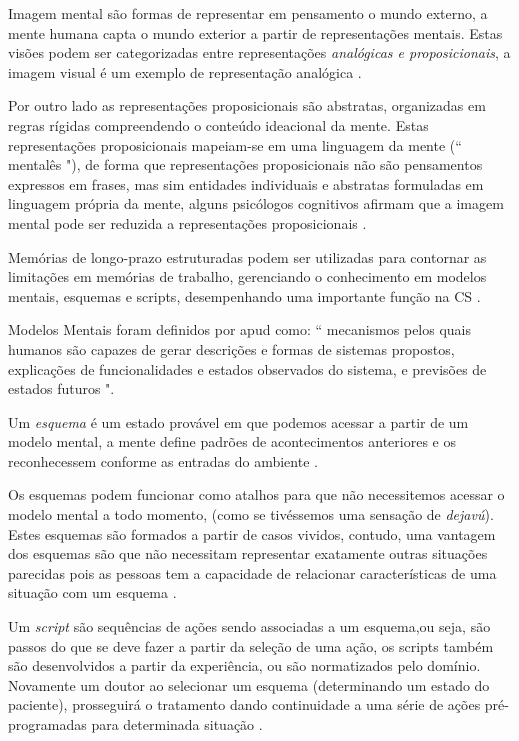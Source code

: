 \documentclass[12pt]{article}
\begin{document}
Imagem mental são formas de representar em pensamento o mundo externo, a mente humana capta o mundo exterior a partir de representações mentais. Estas visões podem ser categorizadas entre representações \textit{analógicas e proposicionais}, a imagem visual é um exemplo de representação analógica \cite{Moreira1996}. 

Por outro lado as representações proposicionais são abstratas, organizadas em regras rígidas compreendendo o conteúdo ideacional da mente. Estas representações proposicionais mapeiam-se em uma linguagem da mente (`` mentalês "), de forma que representações proposicionais não são pensamentos expressos em frases, mas sim entidades individuais e abstratas formuladas em linguagem própria da mente, alguns psicólogos cognitivos afirmam que a imagem mental pode ser reduzida a representações proposicionais  \cite{Moreira1996}.

Memórias de longo-prazo estruturadas podem ser utilizadas para contornar as limitações em memórias de trabalho, gerenciando o conhecimento em modelos mentais, esquemas e scripts, desempenhando uma importante função na CS \cite{Endsley1995}. 

 Modelos Mentais foram definidos por \cite[p.60]{Rouse1985} apud \cite{Endsley1995} como: `` mecanismos pelos quais humanos são capazes de gerar descrições e formas de sistemas propostos, explicações de funcionalidades e estados observados do sistema, e previsões de estados futuros ".

Um \textit{esquema} é um estado provável em que podemos acessar a partir de um modelo mental, a mente define padrões de acontecimentos anteriores e os reconhecessem conforme as entradas do ambiente \cite{Endsley2012}. 

Os esquemas podem funcionar como atalhos para que não necessitemos acessar o modelo mental a todo momento, (como se tivéssemos uma sensação de \textit{dejavú}). Estes esquemas são formados a partir de casos vividos, contudo, uma vantagem dos esquemas são que não necessitam representar exatamente outras situações parecidas pois as pessoas tem a capacidade de relacionar características de uma situação com um esquema \cite{Endsley2012}.

Um \textit{script} são sequências de ações sendo associadas a um esquema,ou seja, são passos do que se deve fazer a partir da seleção de uma ação, os scripts também são desenvolvidos a partir da experiência, ou são normatizados pelo domínio. Novamente um doutor ao selecionar um esquema (determinando um estado do paciente), prosseguirá o tratamento dando continuidade a uma série de ações pré-programadas para determinada situação \cite{Endsley2012}.  
\end{document}
